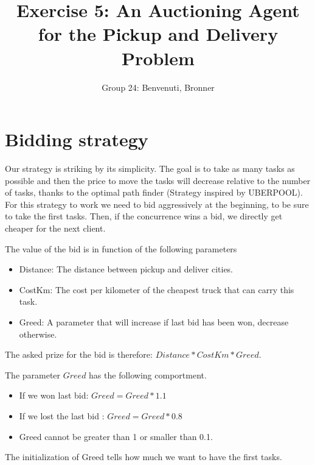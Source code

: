 \documentclass[11pt]{article}
\title{\bf Exercise 5: An Auctioning Agent for the Pickup and Delivery Problem}
\author{Group 24: Benvenuti, Bronner}
\begin{document}
\maketitle

\section{Bidding strategy}
Our strategy is striking by its simplicity. The goal is to take as many tasks as possible and then the price to move the tasks will decrease relative to the number of tasks, thanks to the optimal path finder (Strategy inspired by UBERPOOL). For this strategy to work we need to bid aggressively at the beginning, to be sure to take the first tasks. Then, if the concurrence wins a bid, we directly get cheaper for the next client.

The value of the bid is in function of the following parameters
\begin{itemize}
  \item Distance: The distance between pickup and deliver cities.
  \item CostKm: The cost per kilometer of the cheapest truck that can carry this task.
  \item Greed: A parameter that will increase if last bid has been won, decrease otherwise. 
\end{itemize}

The asked prize for the bid is therefore: $Distance * CostKm * Greed$. 

The parameter $Greed$ has the following comportment.
\begin{itemize}
  \item If we won last bid: $Greed = Greed * 1.1$
  \item If we lost the last bid : $Greed = Greed * 0.8$
  \item Greed cannot be greater than 1 or smaller than 0.1.
\end{itemize}
The initialization of Greed tells how much we want to have the first tasks. 
\end{document}
